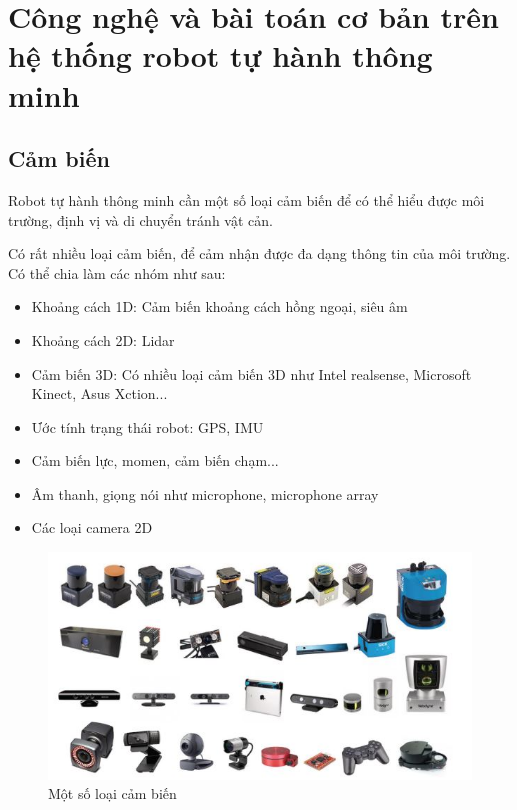 \section{Công nghệ và bài toán cơ bản trên hệ thống robot tự hành thông minh}
\subsection{Cảm biến}
Robot tự hành thông minh cần một số loại cảm biến để có thể hiểu được môi trường, định vị và di chuyển tránh vật cản. 

Có rất nhiều loại cảm biến, để cảm nhận được đa dạng thông tin của môi trường. Có thể chia làm các nhóm như sau:
\begin{itemize}
	\item Khoảng cách 1D: Cảm biến khoảng cách hồng ngoại, siêu âm
	\item Khoảng cách 2D: Lidar
	\item Cảm biến 3D: Có nhiều loại cảm biến 3D như Intel realsense, Microsoft Kinect, Asus Xction...
	\item Ước tính trạng thái robot: GPS, IMU
	\item Cảm biến lực, momen, cảm biến chạm...
	\item Âm thanh, giọng nói như microphone, microphone array
	\item Các loại camera 2D
\end{itemize}

\begin{figure}
	\centering
	\includegraphics[width=\linewidth]{chapter1/figs/CacloaiCB.JPG}
	\caption{Một số loại cảm biến}
	\label{fig:cacLoaiCambien}
\end{figure}

